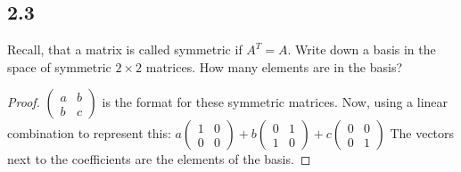 \documentclass{amsart}
\begin{document}
\subsection*{2.3} Recall, that a matrix is called symmetric if $A^T = A$. Write down a basis in the space of symmetric $2 \times 2$ matrices. How many elements are in the basis? 
\begin{proof}
    $\begin{pmatrix}
        a & b \\
        b & c
    \end{pmatrix} 
    $
    is the format for these symmetric matrices. Now, using a linear combination to represent this: 
    $
    a\begin{pmatrix}
        1 & 0 \\
        0 & 0
    \end{pmatrix}
    +
    b\begin{pmatrix}
        0 & 1 \\ 
        1 & 0
    \end{pmatrix}
    + 
    c \begin{pmatrix}
        0 & 0 \\
        0 & 1
    \end{pmatrix}
    $
    The vectors next to the coefficients are the elements of the basis. 
\end{proof}
\end{document}

